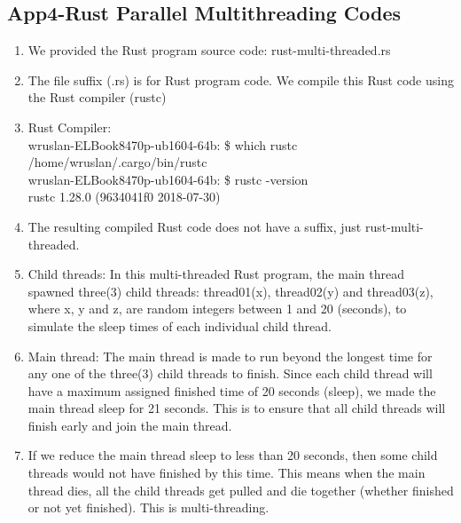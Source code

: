 
\subsection{App4-Rust Parallel Multithreading Codes}
\begin{enumerate}
	\item We provided the Rust program source code: rust-multi-threaded.rs
	
	\item The file suffix (.rs) is for Rust program code. We compile this Rust code using the Rust compiler (rustc)
	
	\item Rust Compiler:\\
	
	wruslan\@HP-ELBook8470p-ub1604-64b: \$ which rustc\\
		/home/wruslan/.cargo/bin/rustc\\
	
	wruslan\@HP-ELBook8470p-ub1604-64b: \$ rustc -version\\
		rustc 1.28.0 (9634041f0 2018-07-30)\\
	
	\item The resulting compiled Rust code does not have a suffix, just rust-multi-threaded.
	
	\item Child threads: In this multi-threaded Rust program, the main thread spawned three(3) child threads: thread01(x), thread02(y) and thread03(z), where x, y and z, are random integers between 1 and 20 (seconds), to simulate the sleep times of each individual child thread.
	
	\item Main thread: The main thread is made to run beyond the longest time for any one of the three(3) child threads to finish. Since each child thread will have a maximum assigned finished time of 20 seconds (sleep), we made the main thread sleep for 21 seconds. This is to ensure that all child threads will finish early and join the main thread.
	
	\item If we reduce the main thread sleep to less than 20 seconds, then some child threads would not have finished by this time. This means when the main thread dies, all the child threads get pulled and die together (whether finished or not yet finished). This is multi-threading.
	

\end{enumerate}

